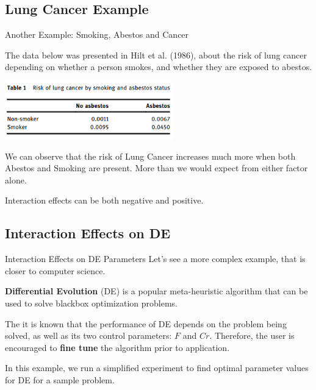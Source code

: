 \subsection{Lung Cancer Example}
\begin{frame}{Another Example: Smoking, Abestos and Cancer}

  The data below was presented in Hilt et al. (1986), about the risk
  of lung cancer depending on whether a person smokes, and whether
  they are exposed to abestos.

  \begin{center}
    \includegraphics[width=0.55\textwidth]{../img/interaction_lungcancer.png}
  \end{center}

  We can observe that the risk of Lung Cancer increases much more when
  both Abestos and Smoking are present. More than we would expect from
  either factor alone.\bigskip

  Interaction effects can be both negative and positive.
\end{frame}


%  



\subsection{Interaction Effects on DE}

\begin{frame}{Interaction Effects on DE Parameters}{}
  Let's see a more complex example, that is closer to computer science.\bigskip

  {\bf Differential Evolution} (DE) is a popular meta-heuristic algorithm
  that can be used to solve blackbox optimization problems.\bigskip

  The it is known that the performance of DE depends on the problem
  being solved, as well as its two control parameters: $F$ and
  $Cr$. Therefore, the user is encouraged to {\bf fine tune} the
  algorithm prior to application.\bigskip

  In this example, we run a simplified experiment to find optimal
  parameter values for DE for a sample problem.
\end{frame}

